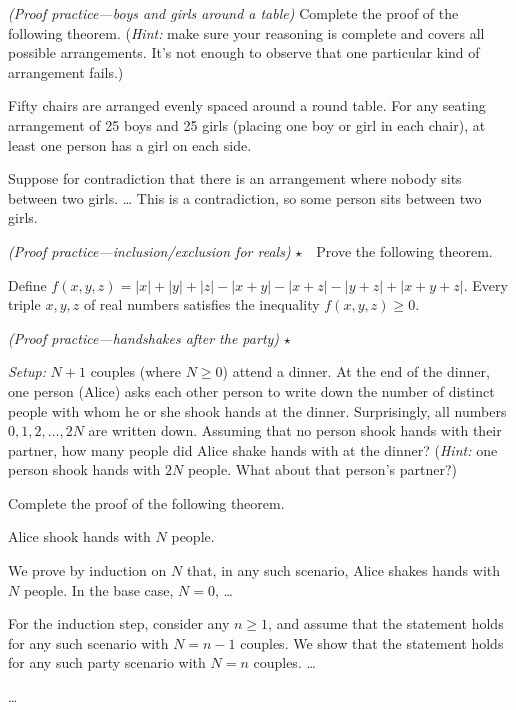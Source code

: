 \exercise \emph{(Proof practice---boys and girls around a table)} %
Complete the proof of the following theorem.
(\emph{Hint:} make sure your reasoning is complete and covers all possible arrangements.
It's not enough to observe that one particular kind of arrangement fails.)

\begin{theorem} 
  Fifty chairs are arranged evenly spaced around a round table.
  For any seating arrangement of  25 boys and 25 girls
  (placing one boy or girl in each chair),
  at least one person has a girl on each side.
\end{theorem}
\begin{longFormProof}
  \step Suppose for contradiction that there is an arrangement
  where nobody sits between two girls. 
  \step \ldots
  \step This is a contradiction, so some person sits between two girls.
\end{longFormProof}

\exercise \emph{(Proof practice---inclusion/exclusion for reals)} $\star$~~Prove the following theorem.

\begin{theorem}
  Define $f(x,y,z) = |x|+|y|+|z|-|x+y|-|x+z|-|y+z|+|x+y+z|$.
  Every triple $x,y,z$ of real numbers satisfies the inequality $f(x,y,z)\ge 0$.
\end{theorem}

\exercise \emph{(Proof practice---handshakes after the party)} $\star$~{}

\emph{Setup:} $N+1$ couples (where $N\ge 0$) attend a dinner. At the end of the dinner, one person (Alice) asks each other person to write down the number of distinct people with whom he or she shook hands at the dinner. Surprisingly, all numbers $0,1,2,\ldots,2N$ are written down. Assuming that no person shook hands with their partner, how many people did Alice shake hands with at the dinner?
(\emph{Hint:} one person shook hands with $2N$ people. What about that person's partner?)

Complete the proof of the following theorem.

\begin{theorem}
  Alice shook hands with $N$ people.
\end{theorem}
\begin{longFormProof}
  \step We prove by induction on $N$ that, in any such scenario,
  Alice shakes hands with $N$ people.
  \step In the base case, $N=0$, \ldots
  \begin{block}
    \step For the induction step, consider any $n\ge 1$,
    and assume that the statement holds for any such scenario with $N=n-1$ couples.
    We show that the statement holds for any such party scenario with $N=n$ couples.
    \step \ldots
  \end{block}
  \step \ldots
\end{longFormProof}


